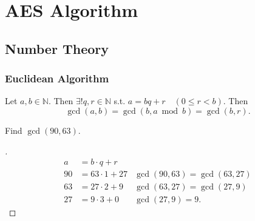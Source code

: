 \chapter{AES Algorithm}

\section{Number Theory}
\subsection{Euclidean Algorithm}
Let $a,b\in\mathbb{N}$. Then $\exists!q,r\in\mathbb{N}$ s.t. 
$a=bq+r\quad(0\leq r<b).$ Then 
$$\gcd(a,b)=\gcd(b,a\bmod b)=\gcd(b,r).$$

\begin{example}
	Find $\gcd(90,63)$.
	\begin{proof}[\sol]
		\begin{align*}
			a &= b\cdot q+ r \\
			90 &= 63\cdot 1 + 27 &\gcd(90,63)=\gcd(63,27) \\
			63 &= 27\cdot 2 + 9 &\gcd(63,27)=\gcd(27,9) \\
			27 &= 9\cdot 3 + 0 &\gcd(27,9)=9.
		\end{align*}
	\end{proof}
\end{example}



\newpage
